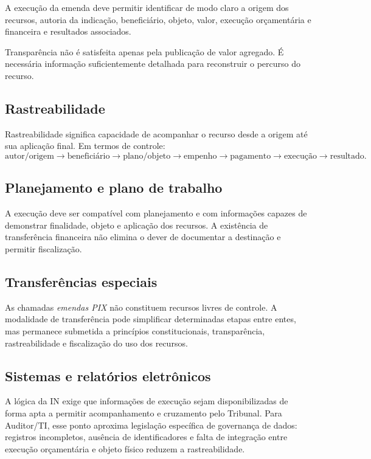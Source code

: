 A execução da emenda deve permitir identificar de modo claro a origem dos recursos, autoria da indicação, beneficiário, objeto, valor, execução orçamentária e financeira e resultados associados.

Transparência não é satisfeita apenas pela publicação de valor agregado. É necessária informação suficientemente detalhada para reconstruir o percurso do recurso.

\subsection{Rastreabilidade}

Rastreabilidade significa capacidade de acompanhar o recurso desde a origem até sua aplicação final. Em termos de controle:
\[
\text{autor/origem}\rightarrow
\text{beneficiário}\rightarrow
\text{plano/objeto}\rightarrow
\text{empenho}\rightarrow
\text{pagamento}\rightarrow
\text{execução}\rightarrow
\text{resultado}.
\]

\subsection{Planejamento e plano de trabalho}

A execução deve ser compatível com planejamento e com informações capazes de demonstrar finalidade, objeto e aplicação dos recursos. A existência de transferência financeira não elimina o dever de documentar a destinação e permitir fiscalização.

\subsection{Transferências especiais}

As chamadas \emph{emendas PIX} não constituem recursos livres de controle. A modalidade de transferência pode simplificar determinadas etapas entre entes, mas permanece submetida a princípios constitucionais, transparência, rastreabilidade e fiscalização do uso dos recursos.

\subsection{Sistemas e relatórios eletrônicos}

A lógica da IN exige que informações de execução sejam disponibilizadas de forma apta a permitir acompanhamento e cruzamento pelo Tribunal. Para Auditor/TI, esse ponto aproxima legislação específica de governança de dados: registros incompletos, ausência de identificadores e falta de integração entre execução orçamentária e objeto físico reduzem a rastreabilidade.

